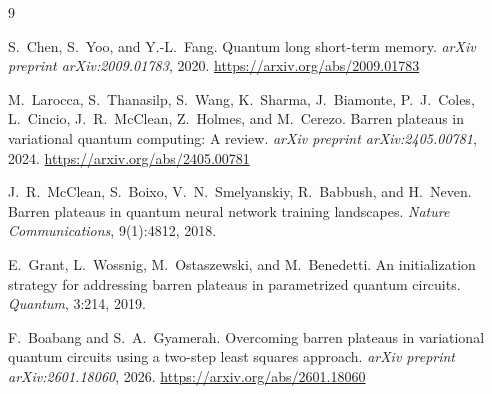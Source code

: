 \documentclass[10pt,twocolumn]{article}
\begin{document}
\begin{thebibliography}{9}
\small

S.\ Chen, S.\ Yoo, and Y.-L.\ Fang.
\newblock Quantum long short-term memory.
\newblock \emph{arXiv preprint arXiv:2009.01783}, 2020.
\newblock \url{https://arxiv.org/abs/2009.01783}

M.\ Larocca, S.\ Thanasilp, S.\ Wang, K.\ Sharma, J.\ Biamonte, P.\ J.\ Coles,
L.\ Cincio, J.\ R.\ McClean, Z.\ Holmes, and M.\ Cerezo.
\newblock Barren plateaus in variational quantum computing: A review.
\newblock \emph{arXiv preprint arXiv:2405.00781}, 2024.
\newblock \url{https://arxiv.org/abs/2405.00781}

J.\ R.\ McClean, S.\ Boixo, V.\ N.\ Smelyanskiy, R.\ Babbush, and H.\ Neven.
\newblock Barren plateaus in quantum neural network training landscapes.
\newblock \emph{Nature Communications}, 9(1):4812, 2018.

E.\ Grant, L.\ Wossnig, M.\ Ostaszewski, and M.\ Benedetti.
\newblock An initialization strategy for addressing barren plateaus in parametrized quantum circuits.
\newblock \emph{Quantum}, 3:214, 2019.

F.\ Boabang and S.\ A.\ Gyamerah.
\newblock Overcoming barren plateaus in variational quantum circuits using a two-step least squares approach.
\newblock \emph{arXiv preprint arXiv:2601.18060}, 2026.
\newblock \url{https://arxiv.org/abs/2601.18060}

\end{thebibliography}
\end{document}
